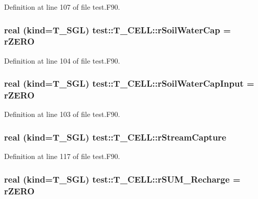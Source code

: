 Definition at line 107 of file test.F90.

\hypertarget{typetest_1_1_t___c_e_l_l_aa0733d39a1e7d03f3e6aa3a4d0270865}{
\subsubsection[{rSoilWaterCap}]{\setlength{\rightskip}{0pt plus 5cm}real (kind={\bf T\_\-SGL}) {\bf test::T\_\-CELL::rSoilWaterCap} = {\bf rZERO}}}
\label{typetest_1_1_t___c_e_l_l_aa0733d39a1e7d03f3e6aa3a4d0270865}


Definition at line 104 of file test.F90.

\hypertarget{typetest_1_1_t___c_e_l_l_ad00429103ddaa3a7b05c970047b263a5}{
\subsubsection[{rSoilWaterCapInput}]{\setlength{\rightskip}{0pt plus 5cm}real (kind={\bf T\_\-SGL}) {\bf test::T\_\-CELL::rSoilWaterCapInput} = {\bf rZERO}}}
\label{typetest_1_1_t___c_e_l_l_ad00429103ddaa3a7b05c970047b263a5}


Definition at line 103 of file test.F90.

\hypertarget{typetest_1_1_t___c_e_l_l_a3d41df1889d6a97b0770b3959f3f811e}{
\subsubsection[{rStreamCapture}]{\setlength{\rightskip}{0pt plus 5cm}real (kind={\bf T\_\-SGL}) {\bf test::T\_\-CELL::rStreamCapture}}}
\label{typetest_1_1_t___c_e_l_l_a3d41df1889d6a97b0770b3959f3f811e}


Definition at line 117 of file test.F90.

\hypertarget{typetest_1_1_t___c_e_l_l_a342995e798c426e0bcfd5b6b41a11b45}{
\subsubsection[{rSUM\_\-Recharge}]{\setlength{\rightskip}{0pt plus 5cm}real (kind={\bf T\_\-SGL}) {\bf test::T\_\-CELL::rSUM\_\-Recharge} = {\bf rZERO}}}
\label{typetest_1_1_t___c_e_l_l_a342995e798c426e0bcfd5b6b41a11b45}


